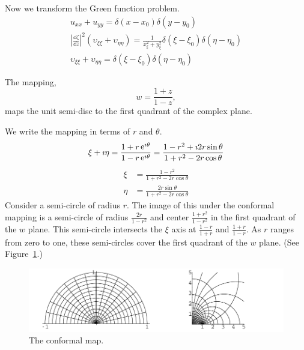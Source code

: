 {\begin{Solution}
\begin{enumerate}
\[    \]
    Now we transform the Green function problem.
    \begin{gather*}
      u_{x x} + u_{y y} = \delta(x-x_0) \delta(y-y_0)
      \\
      \left| \frac{\dd \zeta}{\dd z} \right|^2 \left( \upsilon_{\xi \xi} + \upsilon_{\eta \eta} \right)
      = \frac{1}{x_\xi^2 + y_\xi^2} \delta(\xi-\xi_0) \delta(\eta-\eta_0)
      \\
      \upsilon_{\xi \xi} + \upsilon_{\eta \eta} = \delta(\xi-\xi_0) \delta(\eta-\eta_0)
    \end{gather*}
  \end{enumerate}
\end{Solution}







\begin{Solution}
  The mapping,
  \[
  w = \frac{1+z}{1-z},
  \]
  maps the unit semi-disc to the first quadrant of the complex plane.

  We write the mapping in terms of $r$ and $\theta$.
  \[
  \xi + \imath \eta = \frac{1 + r \mathop{\mathrm{e}}\nolimits^{\imath \theta}}{1 - r \mathop{\mathrm{e}}\nolimits^{\imath \theta}}
  = \frac{ 1 - r^2 + \imath 2 r \sin \theta }{ 1 + r^2 - 2 r \cos \theta }
  \]
  \begin{align*}
    \xi &= \frac{ 1 - r^2 }{ 1 + r^2 - 2 r \cos \theta } \\
    \eta &= \frac{ 2 r \sin \theta }{ 1 + r^2 - 2 r \cos \theta }
  \end{align*}
  Consider a semi-circle of radius $r$.  The image of this under the 
  conformal mapping is a semi-circle of radius $\frac{2r}{1-r^2}$ and center
  $\frac{1+r^2}{1-r^2}$ in the first quadrant of the $w$ plane.  This 
  semi-circle intersects the $\xi$ axis at $\frac{1-r}{1+r}$ and 
  $\frac{1+r}{1-r}$.   As $r$ ranges from zero to one, these semi-circles
  cover the first quadrant of the $w$ plane.
  (See Figure~\ref{cm_sc2fq}.)

  \begin{figure}[h!]
    \begin{center}
      \includegraphics[width=\textwidth]{pde/conformal/cm_sc2fq}
    \end{center}
    \caption{The conformal map.}
    \label{cm_sc2fq}
  \end{figure}


\end{Solution}}
